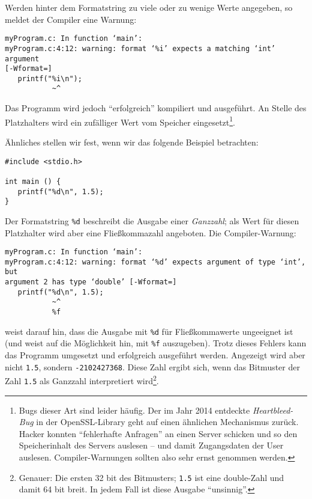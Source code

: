 Werden hinter dem Formatstring zu viele oder zu wenige Werte angegeben, so meldet der Compiler eine Warnung:
\begin{cmdbox}
\begin{verbatim}
myProgram.c: In function ‘main’:
myProgram.c:4:12: warning: format ‘%i’ expects a matching ‘int’ argument 
[-Wformat=]
   printf("%i\n");
           ~^
\end{verbatim}
\end{cmdbox}
Das Programm wird jedoch \enquote{erfolgreich} kompiliert und ausgeführt. An Stelle des Platzhalters wird ein zufälliger Wert vom Speicher eingesetzt\footnote{Bugs dieser Art sind leider häufig. Der im Jahr 2014 entdeckte \emph{Heartbleed-Bug} in der OpenSSL-Library geht auf einen ähnlichen Mechanismus zurück. Hacker konnten \enquote{fehlerhafte Anfragen} an einen Server schicken und so den Speicherinhalt des Servers auslesen -- und damit \eg Zugangsdaten der User auslesen. Compiler-Warnungen sollten also sehr ernst genommen werden.}.

Ähnliches stellen wir fest, wenn wir das folgende Beispiel betrachten:

\begin{codebox}
\begin{verbatim}
#include <stdio.h>

int main () {
   printf("%d\n", 1.5);
}
\end{verbatim}
\end{codebox}
Der Formatstring \texttt{\%d} beschreibt die Ausgabe einer \emph{Ganzzahl}; als Wert für diesen Platzhalter wird aber eine Fließkommazahl angeboten. Die Compiler-Warnung:

\begin{cmdbox}
\begin{verbatim}
myProgram.c: In function ‘main’:
myProgram.c:4:12: warning: format ‘%d’ expects argument of type ‘int’, but 
argument 2 has type ‘double’ [-Wformat=]
   printf("%d\n", 1.5);
           ~^
           %f
\end{verbatim}
\end{cmdbox}
weist darauf hin, dass die Ausgabe mit \texttt{\%d} für Fließkommawerte ungeeignet ist (und weist auf die Möglichkeit hin, mit \texttt{\%f} auszugeben). Trotz dieses Fehlers kann das Programm umgesetzt und erfolgreich ausgeführt werden. Angezeigt wird aber nicht \texttt{1.5}, sondern \texttt{-2102427368}. Diese Zahl ergibt sich, wenn das Bitmuster der Zahl \texttt{1.5} als Ganzzahl interpretiert wird\footnote{Genauer: Die ersten 32 bit des Bitmusters; \texttt{1.5} ist eine double-Zahl und damit 64 bit breit. In jedem Fall ist diese Ausgabe \enquote{unsinnig}.}.

